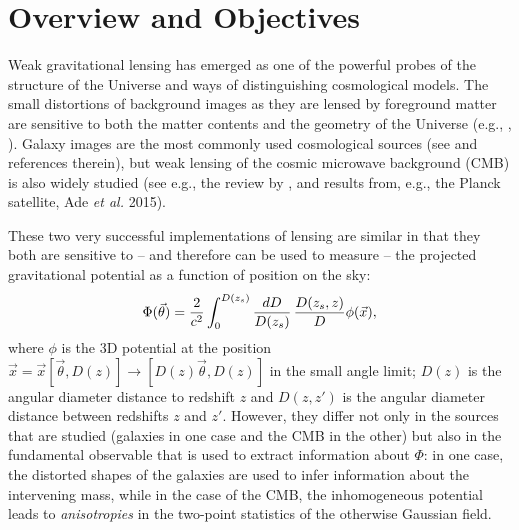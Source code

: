 \section{Overview and Objectives}
Weak gravitational lensing 
has emerged as one of the powerful probes of the
structure of the Universe and ways of distinguishing cosmological models. The 
small distortions of background images as they are lensed by foreground matter
are sensitive to both the matter contents and the geometry of the Universe
(e.g., \cite{blandford92}, \cite{hoekstra2008}).
Galaxy images are the most commonly used cosmological 
sources (see \cite{Kilbinger2015} and references therein),
but weak lensing of the cosmic microwave background (CMB) 
is also widely studied (see e.g., the review by \cite{lewis2006}, and results from, e.g., the Planck satellite, Ade {\it et
 al.} 2015). 
 
These two very successful implementations of lensing are similar in that they both are sensitive to -- and therefore can be used to measure -- the projected gravitational potential as a function of position on the sky:%
\begin{equation}
\Phi(\vec\theta)=\frac{2}{c^2}\int^{D(z_{s})}_{0}\frac{dD}{D(z_s)}\,\frac{D(z_{s},z)}{D}\phi(\vec x),\eql{phi}
\end{equation}
where $\phi$ is the 3D potential at the position $\vec x=\vec x[\vec\theta,D(z)]\rightarrow [D(z)\vec\theta,D(z)]$ in the small angle limit; $D(z)$ is the angular diameter distance to redshift $z$ and $D(z,z')$ is the angular diameter distance between redshifts $z$ and $z'$. However, they
differ not only in the sources that are studied (galaxies in one case and the CMB in the other) but also in the fundamental observable that is used to extract information about $\Phi$: in one case, the distorted shapes of the galaxies are used to infer information about the intervening mass, while in the case of the CMB, the inhomogeneous potential leads to {\it anisotropies} in the two-point statistics of the otherwise Gaussian field. 

